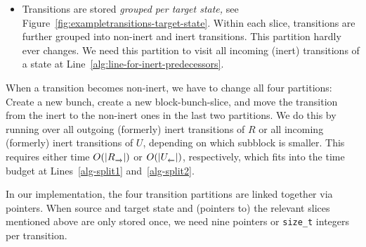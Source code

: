 \documentclass[a4paper,10pt]{article}
\theoremstyle{definition}
\theoremstyle{plain}
\newcommand{\bigo}[1]{{O\!\left(#1\right)}}
\newcommand{\pijl}[1]{\mathrel{\text{$\xrightarrow{\smash[t]{#1}}$}}}
\newcommand{\lijp}[1]{\mathrel{\text{$\xleftarrow{\smash[t]{#1}}$}}}
\newcommand{\size}[1]{\left\lvert #1 \right\rvert}
\newcommand{\TB}{T_{B\pijl{}}}
\newcommand{\TaB}{T_{\pijl{a} B'}}
\begin{document}
\begin{itemize}
	When a bunch is split, we need to regroup the transitions in that bunch as well.
	This is done in time proportional to the smaller new bunch at Line~\ref{alg:split_transitions}.

	We need this partition to visit all outgoing transitions of a state at Line~\ref{alg:slow-test}$\ell$.
	We also use this partition to decide whether a state with a transition in $\TaB$ also has a transition in $\TB \setminus \TaB$:
	While regrouping the transitions in $\TB$ leaving from the same source state,
	we can recognize whether all transitions move to $\TaB$ or some remain in $\TB \setminus \TaB$.
\item	Transitions are stored \emph{grouped per target state,} see Figure~\ref{fig:exampletransitions-target-state}.
	Within each slice, transitions are further grouped into non-inert and inert transitions.
	This partition hardly ever changes.
	We need this partition to visit all incoming (inert) transitions of a state at Line~\ref{alg:line-for-inert-predecessors}.
\end{itemize}
When a transition becomes non-inert, we have to change all four partitions:
Create a new bunch, create a new block-bunch-slice, and move the transition from the inert to the non-inert ones in the last two partitions.
We do this by running over all outgoing (formerly) inert transitions of $R$ or all incoming (formerly) inert transitions of $U$,
depending on which subblock is smaller.
This requires either time $\bigo{\size{R_{\pijl{}}}}$ or $\bigo{\size{U_{\lijp{}}}}$, respectively,
which fits into the time budget at Lines~\ref{alg-split1} and~\ref{alg-split2}.

In our implementation, the four transition partitions are linked together via pointers.
When source and target state and (pointers to) the relevant slices mentioned above are only stored once,
we need nine pointers or \texttt{size\_t} integers per transition.
\end{document}
